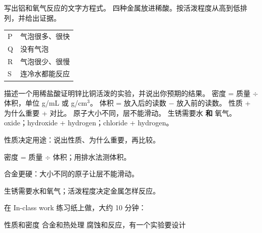  写出铝和氧气反应的文字方程式。
 四种金属放进稀酸。按活泼程度从高到低排列，并给出证据。
\par\vspace{1mm}\hspace*{7mm}\begin{tabular}{@{}l l@{}}
P & 气泡很多、很快\\
Q & 没有气泡\\
R & 气泡很少、很慢\\
S & 连冷水都能反应\\
\end{tabular}
 描述一个用稀盐酸证明锌比铜活泼的实验，并说出你预期的结果。
 密度 = 质量 $\div$ 体积，单位 g/mL 或 g/cm$^{3}$。
 体积 = 放入后的读数 $-$ 放入前的读数。
 性质 + 为什么重要 + 对比。
 原子大小不同，层不能滑动。
 生锈需要水 \textbf{和} 氧气。
 oxide；hydroxide + hydrogen；chloride + hydrogen。
\vspace{4mm}
{\renewcommand\baselinestretch{1.3}\sSum
性质决定用途：说出性质、为什么重要，再比较。\par\vspace{3mm}
密度 = 质量 $\div$ 体积；用排水法测体积。\par\vspace{3mm}
合金更硬：大小不同的原子让层不能滑动。\par\vspace{3mm}
生锈需要水和氧气；活泼程度决定金属怎样反应。\par}
在 In-class work 练习纸上做，大约 10 分钟：\par\vspace{3mm}
 性质和密度
 合金和热处理
 腐蚀和反应，有一个实验要设计
